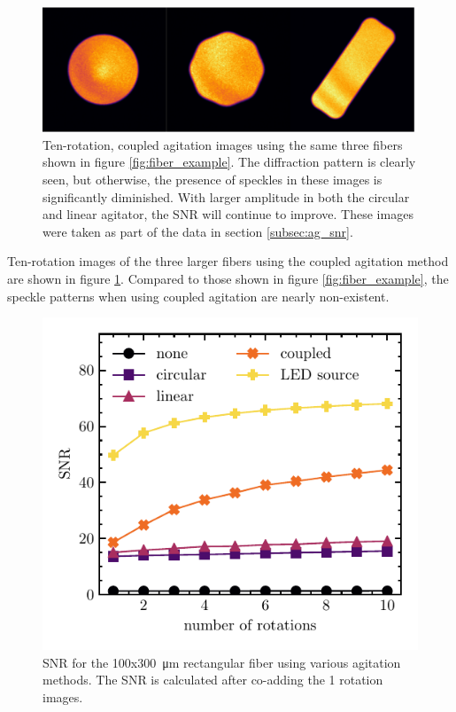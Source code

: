 \documentclass[twocolumn]{emulateapj}
\begin{document}
\begin{figure}
\centering
	\includegraphics[width=\columnwidth]{images/fiber_improved.pdf}
	\caption{Ten-rotation, coupled agitation images using the same three fibers shown in figure \ref{fig:fiber_example}.  The diffraction pattern is clearly seen, but otherwise, the presence of speckles in these images is significantly diminished. With larger amplitude in both the circular and linear agitator, the SNR will continue to improve. These images were taken as part of the data in section \ref{subsec:ag_snr}.}
\label{fig:fiber_improved}
\end{figure}

Ten-rotation images of the three larger fibers using the coupled agitation method are shown in figure \ref{fig:fiber_improved}. Compared to those shown in figure \ref{fig:fiber_example}, the speckle patterns when using coupled agitation are nearly non-existent.

\begin{figure}
\centering
	\includegraphics[width=\columnwidth]{images/rect_snr_vs_time.pdf}
	\caption{SNR for the 100x\SI{300}{\micro\meter} rectangular fiber using various agitation methods. The SNR is calculated after co-adding the 1 rotation images.}
\label{fig:rect_snr_vs_time}
\end{figure}
\end{document}
